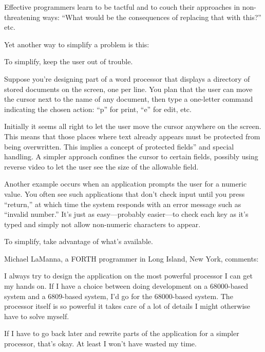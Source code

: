 \noindent Effective programmers learn to be tactful and to couch their
approaches in non-threatening ways: ``What would be the consequences
of replacing that with this?'' etc.

Yet another way to simplify a problem is this:

\begin{tip}
To simplify, keep the user out of trouble.
\end{tip}
Suppose you're designing part of a word processor that displays a
directory of stored documents on the screen, one per line. You plan
that the
user can move the cursor next to the name of any document, then type a
one-letter command indicating the chosen action: ``p'' for print,
``e'' for edit, etc.

Initially it seems all right to let the user move the cursor anywhere
on the screen. This means that those places where text already appears
must be protected from being overwritten. This implies a concept of
protected fields'' and special handling. A simpler approach confines
the cursor to certain fields, possibly using reverse video to let the
user see the size of the allowable field.

Another example occurs when an application prompts the user for a
numeric value. You often see such applications that don't check input
until you press ``return,'' at which time the system responds with an
error message such as ``invalid number.'' It's just as easy---probably
easier---to check each key as it's typed and simply not allow
non-numeric characters to appear.

\begin{tip}
To simplify, take advantage of what's available.
\end{tip}

\begin{interview}
Michael LaManna, a FORTH programmer in Long Island, New York,
comments:

\begin{tfquot}
I always try to design the application on the most powerful processor
I can get my hands on. If I have a choice between doing development on
a 68000-based system and a 6809-based system, I'd go for the
68000-based system. The processor itself is so powerful it takes care
of a lot of details I might otherwise have to solve myself.

If I have to go back later and rewrite parts of the application for a
simpler processor, that's okay. At least I won't have wasted my time.
\end{tfquot}
\end{interview}

